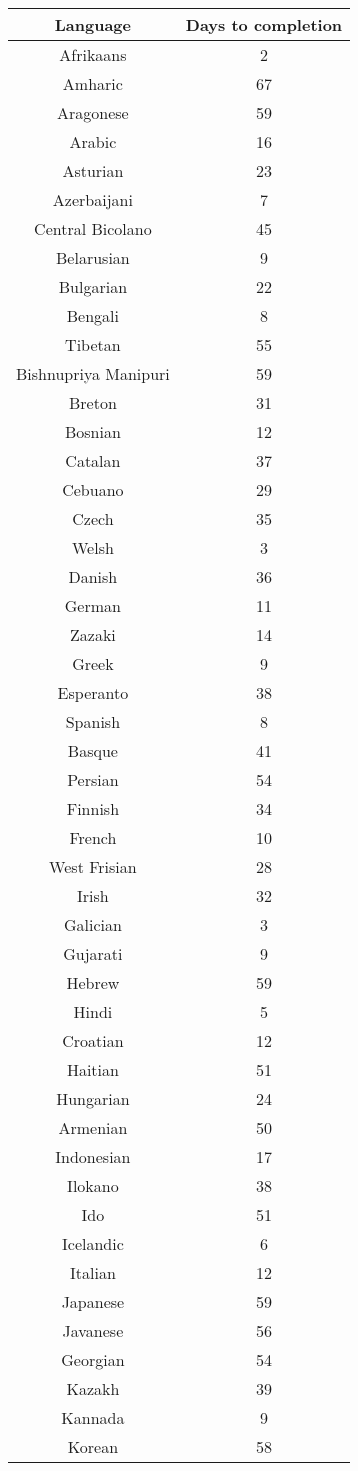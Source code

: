 \begin{figure}[h]
\begin{tabular}{cc}\hline\hline
Language&Days to completion\\
\hline
Afrikaans&2 \\
Amharic&67 \\
Aragonese&59 \\
Arabic&16 \\
Asturian&23 \\
Azerbaijani&7 \\
Central Bicolano&45 \\
Belarusian&9 \\
Bulgarian&22 \\
Bengali&8 \\
Tibetan&55 \\
Bishnupriya Manipuri&59 \\
Breton&31 \\
Bosnian&12 \\
Catalan&37 \\
Cebuano&29 \\
Czech&35 \\
Welsh&3 \\
Danish&36 \\
German&11 \\
Zazaki&14 \\
Greek&9 \\
Esperanto&38 \\
Spanish&8 \\
Basque&41 \\
Persian&54 \\
Finnish&34 \\
French&10 \\
West Frisian&28 \\
Irish&32 \\
Galician&3 \\
Gujarati&9 \\
Hebrew&59 \\
Hindi&5 \\
Croatian&12 \\
Haitian&51 \\
Hungarian&24 \\
Armenian&50 \\
Indonesian&17 \\
Ilokano&38 \\
Ido&51 \\
Icelandic&6 \\
Italian&12 \\
Japanese&59 \\
Javanese&56 \\
Georgian&54 \\
Kazakh&39 \\
Kannada&9 \\
Korean&58 \\
\end{tabular}
\end{figure}
